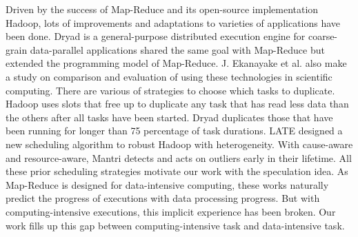 Driven by the success of Map-Reduce \cite{dean} and its open-source implementation Hadoop,
lots of improvements \cite{Zaharia:2008:IMP:1855741.1855744}
\cite{Ananthanarayanan:2010:ROM:1924943.1924962} and adaptations
\cite{Srirama:2012:ASC:2304777.2304882} to varieties of applications have been done. Dryad
\cite{Isard:2007:DDD:1272998.1273005} is a general-purpose distributed execution engine
for coarse-grain data-parallel applications shared the same goal with Map-Reduce but
extended the programming model of Map-Reduce. J. Ekanayake et al.
\cite{Ekanayake:2011:CTB:1990761.1990858} also make a study on comparison and evaluation
of using these technologies in scientific computing. There are various of strategies to
choose which tasks to duplicate. Hadoop uses slots that free up to duplicate any task that
has read less data than the others after all tasks have been started. Dryad duplicates those
that have been running for longer than 75 percentage of task durations. LATE
\cite{Zaharia:2008:IMP:1855741.1855744} designed a new scheduling algorithm to robust
Hadoop with heterogeneity. With cause-aware and resource-aware, Mantri
\cite{Ananthanarayanan:2010:ROM:1924943.1924962} detects and acts on outliers early in
their lifetime. All these prior scheduling strategies motivate our work with the
speculation idea. As Map-Reduce is designed for data-intensive computing, these works
naturally predict the progress of executions with data processing progress. But with
computing-intensive executions, this implicit experience has been broken. Our work fills
up this gap between computing-intensive task and data-intensive task.


